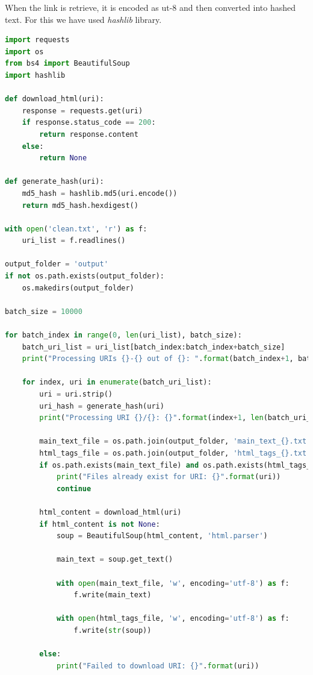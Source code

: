 \documentclass[12pt]{article}
\begin{document}
When the link is retrieve, it is encoded as ut-8 and then converted into hashed text. For this we have used \textit{hashlib} library.
\\ 
\begin{lstlisting}[language=Python, caption=Converting url to hash text]
import requests
import os
from bs4 import BeautifulSoup
import hashlib

def download_html(uri):
    response = requests.get(uri)
    if response.status_code == 200:
        return response.content
    else:
        return None

def generate_hash(uri):
    md5_hash = hashlib.md5(uri.encode())
    return md5_hash.hexdigest()

with open('clean.txt', 'r') as f:
    uri_list = f.readlines()

output_folder = 'output'
if not os.path.exists(output_folder):
    os.makedirs(output_folder)

batch_size = 10000

for batch_index in range(0, len(uri_list), batch_size):
    batch_uri_list = uri_list[batch_index:batch_index+batch_size]
    print("Processing URIs {}-{} out of {}: ".format(batch_index+1, batch_index+len(batch_uri_list), len(uri_list)))

    for index, uri in enumerate(batch_uri_list):
        uri = uri.strip()
        uri_hash = generate_hash(uri)
        print("Processing URI {}/{}: {}".format(index+1, len(batch_uri_list), uri))

        main_text_file = os.path.join(output_folder, 'main_text_{}.txt'.format(uri_hash))
        html_tags_file = os.path.join(output_folder, 'html_tags_{}.txt'.format(uri_hash))
        if os.path.exists(main_text_file) and os.path.exists(html_tags_file):
            print("Files already exist for URI: {}".format(uri))
            continue

        html_content = download_html(uri)
        if html_content is not None:
            soup = BeautifulSoup(html_content, 'html.parser')

            main_text = soup.get_text()

            with open(main_text_file, 'w', encoding='utf-8') as f:
                f.write(main_text)

            with open(html_tags_file, 'w', encoding='utf-8') as f:
                f.write(str(soup))

        else:
            print("Failed to download URI: {}".format(uri))
\end{lstlisting}
\end{document}
